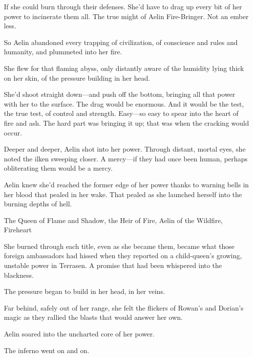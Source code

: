If she could burn through their defenses. She'd have to drag up every bit of her power to incinerate them all. The true might of Aelin Fire-Bringer. Not an ember less.

So Aelin abandoned every trapping of civilization, of conscience and rules and humanity, and plummeted into her fire.

She flew for that flaming abyss, only distantly aware of the humidity lying thick on her skin, of the pressure building in her head.

She'd shoot straight down---and push off the bottom, bringing all that power with her to the surface. The drag would be enormous. And it would be the test, the true test, of control and strength. Easy---so easy to spear into the heart of fire and ash. The hard part was bringing it up;
that was when the cracking would occur.

Deeper and deeper, Aelin shot into her power. Through distant, mortal eyes, she noted the ilken sweeping closer. A mercy---if they had once been human, perhaps obliterating them would be a mercy.

Aelin knew she'd reached the former edge of her power thanks to warning bells in her blood that pealed in her wake. That pealed as she launched herself into the burning depths of hell.

The Queen of Flame and Shadow, the Heir of Fire, Aelin of the Wildfire, Fireheart 

She burned through each title, even as she became them, became what those foreign ambassadors had hissed when they reported on a child-queen's growing, unstable power in Terrasen. A promise that had been whispered into the blackness.

The pressure began to build in her head, in her veins.

Far behind, safely out of her range, she felt the flickers of Rowan's and Dorian's magic as they rallied the blasts that would answer her own.

Aelin soared into the uncharted core of her power.

The inferno went on and on.
